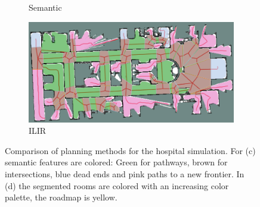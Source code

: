 \begin{figure}[h]
\begin{subfigure}{.5\textwidth}
      \caption{Semantic \cite{fredriksson_semantic_2023}}
    \end{subfigure}%
    \begin{subfigure}{.5\textwidth}
      \centering
      \includegraphics[width=\textwidth]{figures/60_results/aws_roadmap_semantic.png}
      \caption{ILIR}
    \end{subfigure}
    \caption[Comparison of planning methods for the hospital simulation]{Comparison of planning methods for the hospital simulation. For (c) semantic features are colored: Green for pathways, brown for intersections, blue dead ends and pink paths to a new frontier. In (d) the segmented rooms are colored with an increasing color palette, the roadmap is yellow.}
    \label{fig:aws_comparison}
\end{figure}

